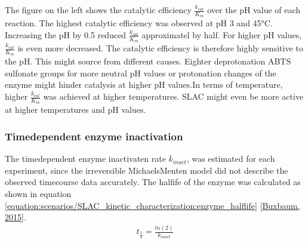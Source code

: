 \documentclass[letterpaper,10pt,english]{jupyterBook}
\begin{document}
\sphinxAtStartPar
The figure on the left shows the catalytic efficiency \(\frac{k_{cat}}{K_{m}}\) over the pH value of each reaction. The highest catalytic efficiency was observed at pH 3 and 45°C. Increasing the pH by 0.5 reduced \(\frac{k_{cat}}{K_{m}}\) approximatel by half. For higher pH values, \(\frac{k_{cat}}{K_{m}}\) is even more decreased. The catalytic efficiency is therefore highly sensitive to the pH. This might source from different causes. Eighter deprotonation ABTS sulfonate groups for more neutral pH values or protonation changes of the enzyme might hinder catalysis at higher pH values.In terms of temperature, higher \(\frac{k_{cat}}{K_{m}}\) was achieved at higher temperatures. SLAC might even be more active at higher temperatures and pH values.


\subsubsection{Time\sphinxhyphen{}dependent enzyme inactivation}
\label{\detokenize{scenarios/SLAC_kinetic_characterization:time-dependent-enzyme-inactivation}}
\sphinxAtStartPar
The time\sphinxhyphen{}dependent enzyme inactivaten rate \(k_{inact}\), was estimated for each experiment, since the irreversible Michaels\sphinxhyphen{}Menten model did not describe the observed time\sphinxhyphen{}course data accurately. The halfife of the enzyme was calculated as shown in equation \eqref{equation:scenarios/SLAC_kinetic_characterization:enzyme_halflife} {[}\hyperlink{cite.references:id8}{Buxbaum, 2015}{]}.
\begin{equation}\label{equation:scenarios/SLAC_kinetic_characterization:enzyme_halflife}
\begin{split}t_{\frac{1}{2}} = \frac{ln(2)}{k_{inact}}\end{split}
\end{equation}
\end{document}
